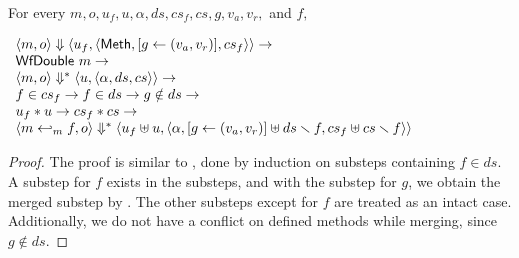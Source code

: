 \begin{lemma}
  \label{lem-inlinedmm-meth1}
  \mbox{}\\
  For every $m, o, u_f, u, \alpha, ds, cs_f, cs, g, v_a, v_r,$ and $f,$
  \begin{center}
    \begin{math}
      \begin{array}{l}
        \langle m, o \rangle \Downarrow \langle u_f, \langle \textsf{Meth},  [ g \leftarrow (v_a, v_r) ], cs_f \rangle \rangle \to \\
        \textsf{WfDouble}\ m \to \\
        \langle m, o \rangle \Downarrow^{\ast} \langle u, \langle \alpha, ds, cs \rangle \rangle \to \\
        f \in cs_f \to f \in ds \to g \notin ds \to \\
        u_f \ast u \to cs_f \ast cs \to \\
        \langle m \hookleftarrow_{m}{} f, o \rangle \Downarrow^{\ast} \langle u_f \uplus u, \langle \alpha,  [ g \leftarrow (v_a, v_r) ] \uplus ds \smallsetminus{} f, cs_f \uplus cs \smallsetminus{} f \rangle \rangle
      \end{array}
    \end{math}
  \end{center}
\end{lemma}
\begin{proof}
  The proof is similar to , done by
  induction on substeps containing $f \in ds$. A substep for $f$
  exists in the substeps, and with the substep for $g$, we obtain the
  merged substep by . The other
  substeps except for $f$ are treated as an intact case. Additionally,
  we do not have a conflict on defined methods while merging, since $g
  \notin ds$.
\end{proof}

